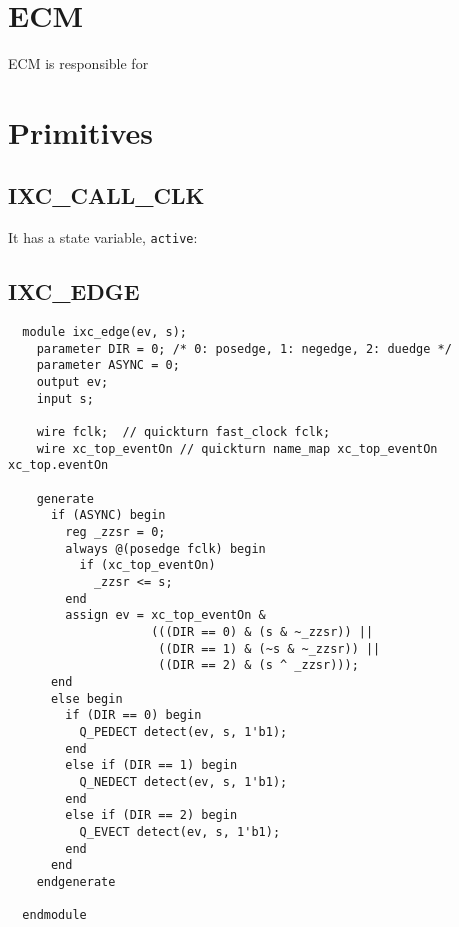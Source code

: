\documentclass{note}
\begin{document}
\section{ECM}
ECM is responsible for 


\section{Primitives}
\subsection{IXC\_CALL\_CLK}
\bit
\w It has a state variable, \verb+active+:
\eit

\subsection{IXC\_EDGE}
\begin{verbatim}
  module ixc_edge(ev, s);
    parameter DIR = 0; /* 0: posedge, 1: negedge, 2: duedge */
    parameter ASYNC = 0;
    output ev;
    input s;

    wire fclk;  // quickturn fast_clock fclk;
    wire xc_top_eventOn // quickturn name_map xc_top_eventOn xc_top.eventOn
    
    generate
      if (ASYNC) begin
        reg _zzsr = 0;
        always @(posedge fclk) begin
          if (xc_top_eventOn) 
            _zzsr <= s;
        end
        assign ev = xc_top_eventOn &
                    (((DIR == 0) & (s & ~_zzsr)) ||          
                     ((DIR == 1) & (~s & ~_zzsr)) ||          
                     ((DIR == 2) & (s ^ _zzsr)));
      end 
      else begin
        if (DIR == 0) begin
          Q_PEDECT detect(ev, s, 1'b1);
        end
        else if (DIR == 1) begin
          Q_NEDECT detect(ev, s, 1'b1);
        end
        else if (DIR == 2) begin
          Q_EVECT detect(ev, s, 1'b1);
        end
      end
    endgenerate
    
  endmodule
\end{verbatim}
\end{document}
